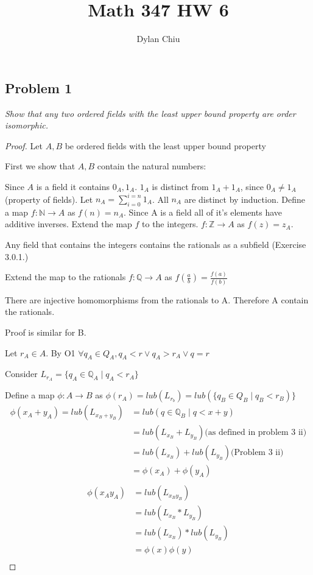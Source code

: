 \documentclass[12pt, a4paper]{article}
\title{Math 347 HW 6}
\author{Dylan Chiu}
\begin{document}
    \maketitle
    \subsection*{Problem 1}
        \textit{Show that any two ordered fields with the least upper bound
        property are order isomorphic.}
        \begin{proof}
            
            Let $A,B$ be ordered fields with the least upper bound property
            
            First we show that $A,B$ contain the natural numbers:
            
            Since $A$ is a field it contains $0_A, 1_A.$
            $1_A$ is distinct from $1_A+1_A$, since $0_A \not= 1_A$ (property of fields).
            Let $n_A=\sum_{i=0}^{i=n}{1_A}$. All $n_A$ are distinct by induction.
            Define a map $f: \mathbb{N} \rightarrow A$ as $f(n)=n_A$.
            Since A is a field all of it's elements have additive inverses. Extend the map $f$ to the integers.
            $f: \mathbb{Z} \rightarrow A$ as $f(z)=z_A$.
            
            Any field that contains the integers contains the rationals as a subfield (Exercise 3.0.1.)

            Extend the map to the rationals $f: \mathbb{Q} \rightarrow A$ as $f(\frac{a}{b})=\frac{f(a)}{f(b)}$

            There are injective homomorphisms from the rationals to A. Therefore A contain the rationals.

            Proof is similar for B. 

            Let $r_A\in A$. By O1 $\forall q_A\in Q_A, q_A < r \lor q_A > r_A \lor q = r $

            Consider $L_{r_A} = \{q_A \in \mathbb{Q}_A\mid q_A < r_A\}$

            Define a map $\phi: A \rightarrow B$ as $\phi(r_A) = lub(L_{r_b}) = lub(\{q_B\in Q_B \mid q_B < r_B)\}$
            \begin{align*}
            \phi(x_A+y_A) = lub(L_{x_B+y_B}) &= lub({q \in \mathbb{Q}_B \mid q < x+y})\\
           &= lub(L_{x_B}+L_{y_B}) \text{(as defined in problem 3 ii)}\\
            &=lub(L_{x_B})+lub(L_{y_B}) \text{(Problem 3 ii)}\\
            &=\phi(x_A)+\phi(y_A)\\
            \end{align*}
            \begin{align*}
                \phi(x_Ay_A)&=lub(L_{x_By_B})\\
                &=lub(L_{x_B}*L_{y_B})\\
                &=lub(L_{x_B})*lub(L_{y_B})\\
                &=\phi(x)\phi(y)\\
            \end{align*}
        \end{proof}
\end{document}
